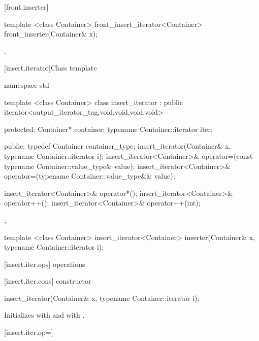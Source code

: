 [front.inserter]{}

%
\begin{itemdecl}
template <class Container>
  front_insert_iterator<Container> front_inserter(Container& x);
\end{itemdecl}

\begin{itemdescr}
\pnum
\returns
{}.
\end{itemdescr}

[insert.iterator]{Class template }

%
\begin{codeblock}
namespace std {
  template <class Container>
  class insert_iterator :
    public iterator<output_iterator_tag,void,void,void,void> {
  protected:
    Container* container;
    typename Container::iterator iter;

  public:
    typedef Container container_type;
    insert_iterator(Container& x, typename Container::iterator i);
    insert_iterator<Container>&
      operator=(const typename Container::value_type& value);
    insert_iterator<Container>&
      operator=(typename Container::value_type&& value);

    insert_iterator<Container>& operator*();
    insert_iterator<Container>& operator++();
    insert_iterator<Container>& operator++(int);
  };

  template <class Container>
    insert_iterator<Container> inserter(Container& x, typename Container::iterator i);
}
\end{codeblock}

[insert.iter.ops]{ operations}

[insert.iter.cons]{ constructor}

%
\begin{itemdecl}
insert_iterator(Container& x, typename Container::iterator i);
\end{itemdecl}

\begin{itemdescr}
\pnum
\effects
Initializes
with  and
with .
\end{itemdescr}

[insert.iter.op=]{}

